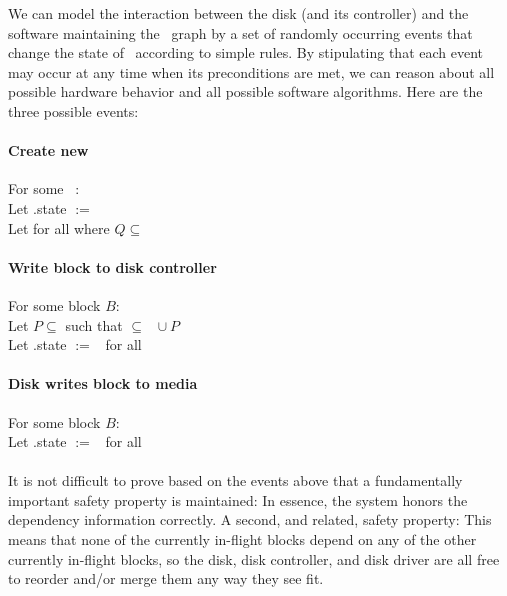 We can model the interaction between the disk (and its controller) and the
software maintaining the \chdesc\ graph by a set of randomly occurring events
that change the state of \chdescs\ according to simple rules. By stipulating
that each event may occur at any time when its preconditions are met, we can
reason about all possible hardware behavior and all possible software
algorithms. Here are the three possible events:

\paragraph{Create new \chdesc}
For some \chdesc\ : \\
Let .state $:=$ \statenone \\
Let  for all  where $Q \subseteq$ \ChAll %

\paragraph{Write block to disk controller}
For some block $B$: \\
Let $P \subseteq$  such that  $\subseteq$ \ChDisk\ $\cup\ P$ \\
Let .state $:=$ \stateinf\ for all 

\paragraph{Disk writes block to media}
For some block $B$: \\
Let .state $:=$ \statedisk\ for all 

\paragraph{} It is not difficult to prove based on the events above that a
fundamentally important safety property is maintained:
%
%
\noindent In essence, the system honors the
dependency information correctly. A second, and related, safety property:
%
%
\noindent This means that none of the currently in-flight blocks depend on any of the
other currently in-flight blocks, so the disk, disk controller, and disk driver
are all free to reorder and/or merge them any way they see fit.

